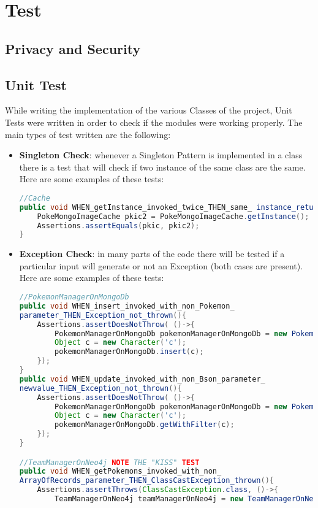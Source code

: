 \section{Test}
\subsection{Privacy and Security}
\subsection{Unit Test}
While writing the implementation of the various Classes of the project, Unit Tests were written in order to check if the modules were working properly. The main types of test written are the following:
\begin{itemize}
	\item \textbf{Singleton Check}: whenever a Singleton Pattern is implemented in a class there is a test that will check if two instance of the same class are the same. Here are some examples of these tests:
\begin{lstlisting}[language=Java]
//Cache
public void WHEN_getInstance_invoked_twice_THEN_same_ instance_returned(){
	PokeMongoImageCache pkic2 = PokeMongoImageCache.getInstance();
	Assertions.assertEquals(pkic, pkic2);
}
\end{lstlisting}
	\item \textbf{Exception Check}: in many parts of the code there will be tested if a particular input will generate or not an Exception (both cases are present). Here are some examples of these tests:
\begin{lstlisting}[language=Java]
//PokemonManagerOnMongoDb
public void WHEN_insert_invoked_with_non_Pokemon_
parameter_THEN_Exception_not_thrown(){
	Assertions.assertDoesNotThrow( ()->{
		PokemonManagerOnMongoDb pokemonManagerOnMongoDb = new PokemonManagerOnMongoDb();
		Object c = new Character('c');
		pokemonManagerOnMongoDb.insert(c);
	});
}
public void WHEN_update_invoked_with_non_Bson_parameter_
newvalue_THEN_Exception_not_thrown(){
	Assertions.assertDoesNotThrow( ()->{
		PokemonManagerOnMongoDb pokemonManagerOnMongoDb = new PokemonManagerOnMongoDb();
		Object c = new Character('c');
		pokemonManagerOnMongoDb.getWithFilter(c);
	});
}

//TeamManagerOnNeo4j NOTE THE "KISS" TEST
public void WHEN_getPokemons_invoked_with_non_
ArrayOfRecords_parameter_THEN_ClassCastException_thrown(){
	Assertions.assertThrows(ClassCastException.class, ()->{
		TeamManagerOnNeo4j teamManagerOnNeo4j = new TeamManagerOnNeo4j();
		

\end{lstlisting}
\end{itemize}
